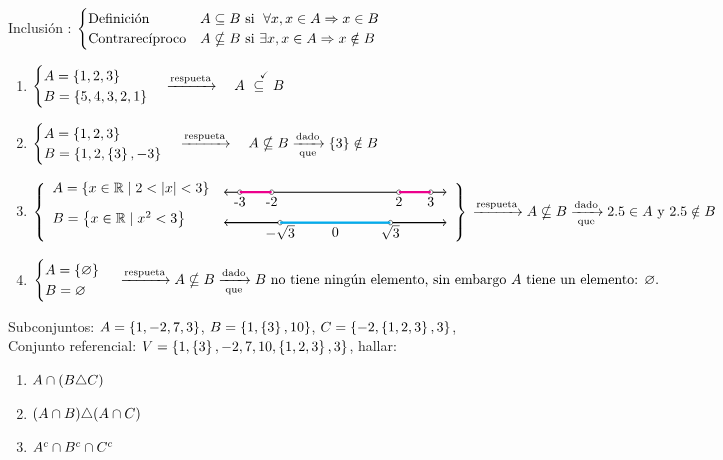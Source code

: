\ejercicio
Inclusión :
$
	\begin{cases}
		\text{Definición}      & A \subseteq B \text{ si } \;\forall x, x \in A \Rightarrow x \in B   \\
		\text{Contrarecíproco} & A \nsubseteq B \text{ si } \exists x, x \in A \Rightarrow x \notin B
	\end{cases}
$
\begin{enumerate}[label=(\roman*)]
	\item $\begin{cases}
			      A = \set{1, 2, 3} \\
			      B = \set{5,4,3,2,1}
		      \end{cases}
		      \flecha{respueta} \quad
		      A \stacktext{\Tilde}{\subseteq} B$
	\item $\begin{cases}
			      A = \set{1, 2, 3} \\
			      B = \set{1,2,\set{3},-3}
		      \end{cases}
		      \flecha{respueta} \quad
		      A \nsubseteq B \flecha{dado}[que] \set{3} \notin B$
	\item $
		      \llaves{ll}{
			      A = \set{x \en \reales \talque 2<|x|<3} & \tresiiiUno \\
			      B = \set{x \en \reales \talque x^2 < 3 } & \tresiiiDos
		      }\\
		      \flecha{respueta} A \nsubseteq B \flecha{dado}[que] 2.5 \en A \text{ y } 2.5 \notin B
	      $
	\item$
		      \begin{cases}
			      A = \set{\vacio} \\
			      B = \vacio
		      \end{cases}\\
		      \flecha{respueta}
		      A \nsubseteq B \flecha{dado}[que] \text{$B$ no tiene ningún elemento, sin embargo $A$ tiene un elemento: $\vacio$.}
	      $
\end{enumerate}

\ejercicio
Subconjuntos: $A = \left\{ 1, -2, 7, 3 \right\}$, $B = \left\{ 1, \left\{ 3 \right\}, 10 \right\}$, $C = \left\{ -2,\left\{ 1,2,3 \right\},3 \right\}$,\\
Conjunto referencial: $V = \left\{ 1,\left\{ 3 \right\}, -2,7, 10, \left\{ 1,2,3 \right\},3 \right\}$, hallar:

\begin{multicols}{2}
	\begin{enumerate}[label=(\roman*)]
		\item $A \cap (B \triangle C)$
		\item $(A \cap B) \triangle (A \cap C)$
		\item $A^c \cap B^c \cap C^c$
	\end{enumerate}
\end{multicols}

